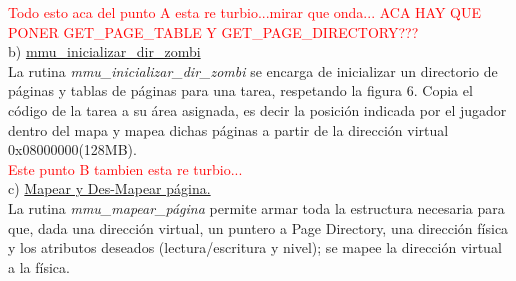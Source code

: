 \documentclass[a4paper]{article}
\begin{document}
\textcolor{red}{Todo esto aca del punto A esta re turbio...mirar que onda... ACA HAY QUE PONER GET_PAGE_TABLE Y GET_PAGE_DIRECTORY???}\\











{\large b)} \underline{mmu_inicializar_dir_zombi}\\

La rutina \textit{mmu_inicializar_dir_zombi} se encarga de inicializar un directorio
de p\'aginas y tablas de p\'aginas para una tarea, respetando la figura 6. Copia
el c\'odigo de la tarea a su \'area asignada, es decir la posici\'on indicada por el jugador dentro
del mapa y mapea dichas p\'aginas a partir de la direcci\'on virtual 0x08000000(128MB).\\

\textcolor{red}{Este punto B tambien esta re turbio...}\\


{\large c)} \underline{Mapear y Des-Mapear p\'agina.}\\

 La rutina \textit{mmu_mapear_p\'agina} permite armar toda la estructura necesaria para que, dada una direcci\'on virtual, un puntero a Page Directory, una direcci\'on f\'isica y los atributos deseados (lectura/escritura y nivel); se mapee la direcci\'on virtual a la f\'isica.\\
 
\end{document}
